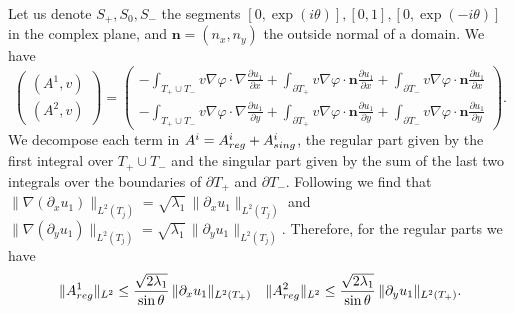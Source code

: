 \documentclass[11pt]{article}
\numberwithin{equation}{section}\newtheorem*{jepEnonce}{\jepEnonceTitle}\newenvironment{enonce*}[1]{\def\jepEnonceTitle{#1}\jepEnonce}{\endjepEnonce}\newtheorem*{conj*}{Conjecture}
\theoremstyle{plain}
\theoremstyle{definition}
\newcommand{\bo}[1]{{\boldsymbol#1}}
\newcommand{\reg}{\textup{reg}}
\newcommand{\sing}{\textup{sing}}
\begin{document}
Let us denote $S_+, S_0, S_-$ the segments $[0,\exp (i \theta)], [0,1], [0,\exp (-i \theta)]$ in the complex plane, and $\bo n=(n_x,n_y)$ the outside normal of a domain. We have
\[
\begin{pmatrix} (A^1,v)\\ (A^2,v) \end{pmatrix} = \begin{pmatrix} - \int_{T_+\cup T_-} v \nabla \varphi \cdot \nabla \frac{\partial u_1}{\partial x} + \int_{\partial T_+} v \nabla \varphi \cdot \bo n \frac{\partial u_1}{\partial x} +\int_{\partial T_-} v \nabla \varphi \cdot \bo n \frac{\partial u_1}{\partial x} \\[5pt] - \int_{T_+\cup T_-} v \nabla \varphi \cdot \nabla \frac{\partial u_1}{\partial y} + \int_{\partial T_+} v \nabla \varphi \cdot \bo n \frac{\partial u_1}{\partial y} +\int_{\partial T_-} v \nabla \varphi \cdot \bo n \frac{\partial u_1}{\partial y} \end{pmatrix}.
\]
We decompose each term in $A^i=A^i_{\reg}+A^i_{\sing}$, the regular part given by the first integral over $T_+\cup T_-$ and the singular part given by the sum of the last two integrals over the boundaries of $\partial T_+$ and $\partial T_-$. Following \cite[Lem.\,3.4.1.2-3]{grisvard} we find that $\|\nabla(\partial_x u_1)\|_{L^2(T_j)} = \sqrt{\lambda_1}\, \|\partial_x u_1\|_{L^2(T_j)}$ and $\|\nabla(\partial_y u_1)\|_{L^2(T_j)} = \sqrt{\lambda_1}\, \|\partial_y u_1\|_{L^2(T_j)}$. Therefore, for the regular parts we have
\[
\|A^1_{\reg}\|_{L^2} \leq \frac{\sqrt{2\lambda_1}}{\sin \theta}\, \|\partial_x u_1\|_{L^2(T_+)} \quad \|A^2_{\reg}\|_{L^2} \leq \frac{\sqrt{2\lambda_1}}{\sin \theta}\,\|\partial_y u_1\|_{L^2(T_+)}.
\]
\end{document}
